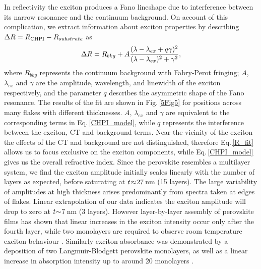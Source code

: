 In reflectivity the exciton produces a Fano lineshape due to interference between its narrow resonance and the continuum background. On account of this complication, we extract information about exciton properties by describing $\Delta R = R_{\textnormal{CHPI}} - R_{substrate}$ as
\begin{equation}
\centering
\Delta R = R_{bkg} + A\frac{(\lambda - \lambda_{ex} + q\gamma)^2}{(\lambda - \lambda_{ex})^2 + \gamma^2} , 
\label{R_fit}
\end{equation}
where $R_{bkg}$ represents the continuum background with Fabry-Perot fringing; $A$, $\lambda_{ex}$ and $\gamma$ are the amplitude, wavelength, and linewidth of the exciton respectively, and the parameter $q$ describes the asymmetric shape of the Fano resonance. The results of the fit are shown in Fig.\,\ref{5Fig5} for positions across many flakes with different thicknesses. $A$, $\lambda_{ex}$ and $\gamma$ are equivalent to the corresponding terms in Eq.\,\ref{CHPI_model}, while $q$ represents the interference between the exciton, CT and background terms. Near the vicinity of the exciton the effects of the CT and background are not distinguished, therefore Eq.\,\ref{R_fit} allows us to focus exclusive on the exciton components, while Eq.\,\ref{CHPI_model} gives us the overall refractive index. Since the perovskite resembles a multilayer system, we find the exciton amplitude initially scales linearly with the number of layers as expected, before saturating at $t\negmedspace\approx\negmedspace27$\,nm (15 layers). The large variability of amplitudes at high thickness arises predominantly from spectra taken at edges of flakes. Linear extrapolation of our data indicates the exciton amplitude will drop to zero at $t\negmedspace\sim\negmedspace7$\,nm (3 layers). However layer-by-layer assembly of perovskite films has shown that linear increases in the exciton intensity occur only after the fourth layer, while two monolayers are required to observe room temperature exciton behaviour \cite{Matsui2002}. %
Similarly exciton absorbance was demonstrated by a deposition of two Langmuir-Blodgett perovskite monolayers, as well as a linear increase in absorption intensity up to around 20 monolayers \cite{Era2000}. %


